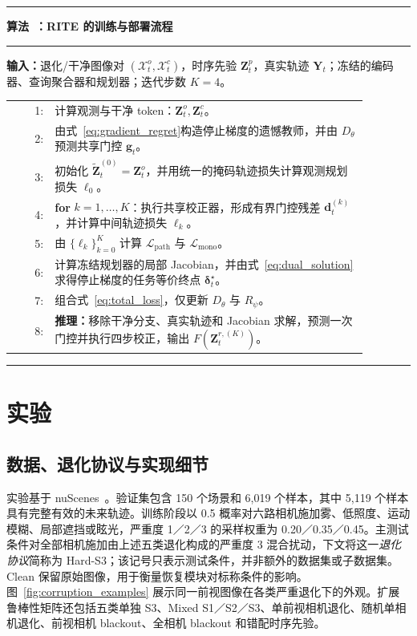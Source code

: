 \documentclass[letterpaper,10pt,conference]{ieeeconf}
\newcounter{algorithm}
\begin{document}
\begin{center}
\label{alg:rite}
\begin{minipage}{0.97\columnwidth}
\hrule\vspace{2pt}
\textbf{算法~\thealgorithm：RITE 的训练与部署流程}
\vspace{2pt}\hrule\vspace{2pt}
\scriptsize
\textbf{输入：}退化/干净图像对 $(\mathcal X_t^o,\mathcal X_t^c)$，时序先验 $\mathbf Z_t^p$，真实轨迹 $\mathbf Y_t$；冻结的编码器、查询聚合器和规划器；迭代步数 $K=4$。\\[-1pt]
\begin{tabular}{@{}r p{0.88\linewidth}@{}}
1: & 计算观测与干净 token：$\mathbf Z_t^o,\mathbf Z_t^c$。\\
2: & 由式~\eqref{eq:gradient_regret}构造停止梯度的遗憾教师，并由 $D_\theta$ 预测共享门控 $\mathbf g_t$。\\
3: & 初始化 $\tilde{\mathbf Z}_t^{(0)}=\mathbf Z_t^o$，并用统一的掩码轨迹损失计算观测规划损失 $\ell_0$。\\
4: & \textbf{for} $k=1,\ldots,K$：执行共享校正器，形成有界门控残差 $\mathbf d_t^{(k)}$，并计算中间轨迹损失 $\ell_k$。\\
5: & 由 $\{\ell_k\}_{k=0}^{K}$ 计算 $\mathcal L_{\mathrm{path}}$ 与 $\mathcal L_{\mathrm{mono}}$。\\
6: & 计算冻结规划器的局部 Jacobian，并由式~\eqref{eq:dual_solution}求得停止梯度的任务等价终点 $\boldsymbol\delta_t^\star$。\\
7: & 组合式~\eqref{eq:total_loss}，仅更新 $D_\theta$ 与 $R_\psi$。\\
8: & \textbf{推理：}移除干净分支、真实轨迹和 Jacobian 求解，预测一次门控并执行四步校正，输出 $F(\mathbf Z_t^{r,(K)})$。\\
\end{tabular}
\vspace{1pt}\hrule
\end{minipage}
\end{center}

\section{实验}

\subsection{数据、退化协议与实现细节}

实验基于 nuScenes~\cite{caesar2020nuscenes}。验证集包含 150 个场景和 6,019 个样本，其中 5,119 个样本具有完整有效的未来轨迹。训练阶段以 0.5 概率对六路相机施加雾、低照度、运动模糊、局部遮挡或眩光，严重度 1／2／3 的采样权重为 0.20／0.35／0.45。主测试条件对全部相机施加由上述五类退化构成的严重度 3 混合扰动，下文将这一\emph{退化协议}简称为 Hard-S3；该记号只表示测试条件，并非额外的数据集或子数据集。Clean 保留原始图像，用于衡量恢复模块对标称条件的影响。图~\ref{fig:corruption_examples} 展示同一前视图像在各类严重退化下的外观。扩展鲁棒性矩阵还包括五类单独 S3、Mixed S1／S2／S3、单前视相机退化、随机单相机退化、前视相机 blackout、全相机 blackout 和错配时序先验。
\end{document}

